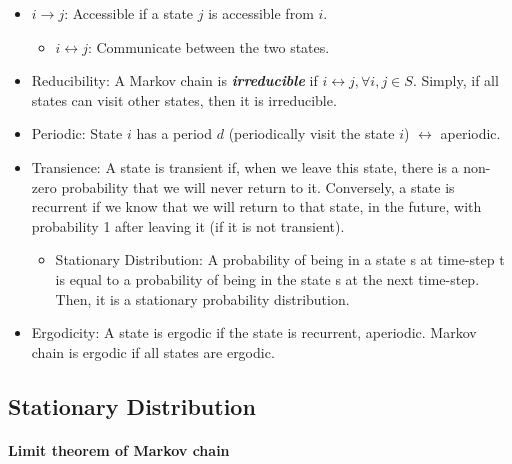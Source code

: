 \begin{itemize}
	\item $i \to j$: Accessible if a state $j$ is accessible from $i$. 
		\begin{itemize}
			\item $i \leftrightarrow j$: Communicate between the two states.
		\end{itemize}
	\item Reducibility: A Markov chain is \textbf{\textit{irreducible}} if $i\leftrightarrow j, \forall i,j\in S$. Simply, if all states can visit other states, then it is irreducible. 
	\item Periodic: State $i$ has a period $d$ (\ie periodically visit the state $i$) $\leftrightarrow$ aperiodic.
	\item Transience: A state is transient if, when we leave this state, there is a non-zero probability that we will never return to it. Conversely, a state is recurrent if we know that we will return to that state, in the future, with probability 1 after leaving it (if it is not transient). 
		\begin{itemize}
			\item Stationary Distribution: A probability of being in a state s at time-step t is equal to a probability of being in the state s at the next time-step. Then, it is a stationary probability distribution.
		\end{itemize}
	\item Ergodicity: A state is ergodic if the state is recurrent, aperiodic. Markov chain is ergodic if all states are ergodic. 
\end{itemize}

\subsection{Stationary Distribution}


\paragraph{Limit theorem of Markov chain}

